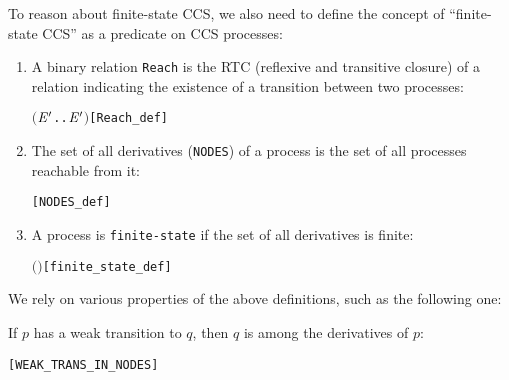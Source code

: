 To reason about finite-state CCS, we also need to define the concept
of ``finite-state CCS'' as a predicate on CCS processes:
\begin{definition}
  \mbox{}
\begin{enumerate}
\item A binary relation \texttt{Reach} is the RTC (reflexive and transitive
  closure) of a relation indicating the existence of a transition between two processes:
\begin{alltt}
 \HOLTokenDefEquality{} \ensuremath{(}\HOLTokenLambda{} \ensuremath{\HOLBoundVar{E}\sp{\prime}}. \HOLSymConst{\HOLTokenExists{}}.  \HOLTokenTransBegin{}\HOLTokenTransEnd \ensuremath{\HOLBoundVar{E}\sp{\prime}}\ensuremath{)}\HOLSymConst{\HOLTokenSupStar{}}\hfill[Reach_def]
\end{alltt}
\item The set of all derivatives (\texttt{NODES}) of a process is the
  set of all processes reachable from it:
\begin{alltt}
  \HOLTokenDefEquality{} \HOLTokenLeftbrace{} \HOLTokenBar{}   \HOLTokenRightbrace{}\hfill[NODES_def]
\end{alltt}
\item A process is \texttt{finite-state} if the set of all derivatives is finite:
\begin{alltt}
  \HOLTokenDefEquality{}  \ensuremath{(} \ensuremath{)}\hfill[finite_state_def]
\end{alltt}
\end{enumerate}
\end{definition}
We rely on various 
 properties of the above definitions, such as the following one:
\begin{proposition}
If $p$ has a weak transition to $q$, then $q$ is among the derivatives of $p$:
\begin{alltt}
\HOLTokenTurnstile{}  \HOLTokenWeakTransBegin{}\HOLTokenWeakTransEnd {} \HOLSymConst{\HOLTokenImp{}}  \HOLSymConst{\HOLTokenIn{}}  \hfill[WEAK_TRANS_IN_NODES]
\end{alltt}
\end{proposition}

